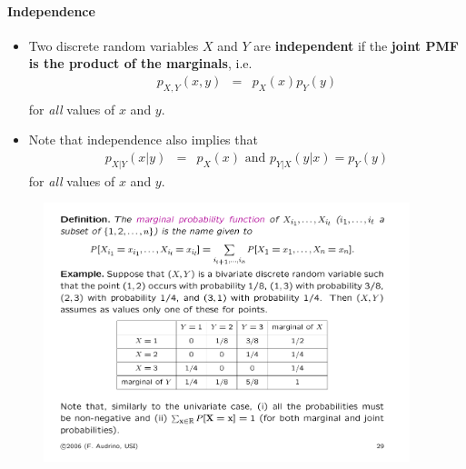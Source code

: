 \documentclass[notes=show,handout]{beamer}\usepackage[]{graphicx}\usepackage[]{color}
\newenvironment{stepitemize}{\begin{itemize}[<+->]}{\end{itemize} }
\begin{document}
\begin{frame}{\secname}
  \framesubtitle{Independence}
  \begin{stepitemize}
  \item Two discrete random variables $X$ and $Y$ are \textbf{independent} if
  the \textbf{joint PMF is the product of the marginals}, i.e.
  \begin{eqnarray*}
  p_{X,Y}(x,y) &=&p_{X}(x)p_{Y}(y)\\
  \end{eqnarray*}
  for \emph{all} values of $x$ and $y$.
  \pause
  \item Note that independence also implies that
  \begin{eqnarray*}
  p_{X|Y}(x|y) &=&p_{X}(x)\text{\ and \  } p_{Y|X}(y|x)=p_{Y}(y)
  \end{eqnarray*}
  for \emph{all} values of $x$ and $y.$
  \end{stepitemize}
\end{frame}


\begin{frame}{\secname}
  \begin{example}
  \begin{figure}[ptb]\centering
  \includegraphics[width=0.95\textwidth,height=0.75\textheight]{img/ex_audrins.pdf}
  \end{figure}
  \end{example}
\end{frame}
\end{document}
